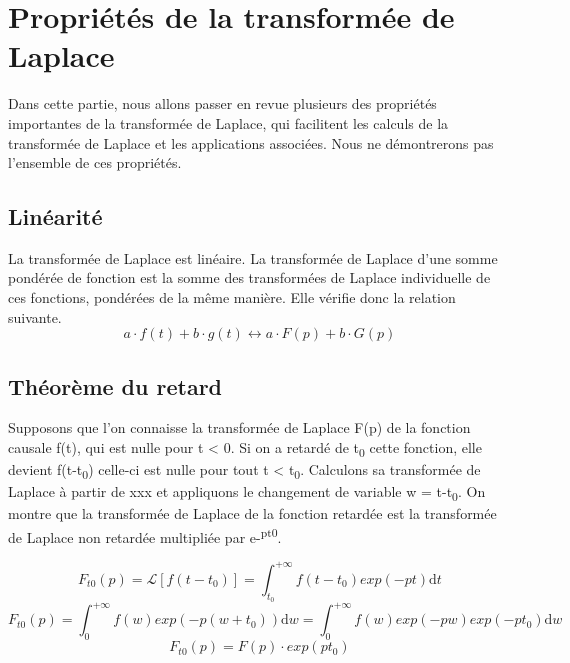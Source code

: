 \documentclass[]{report}
\newcommand{\deriv}{\mathrm{d}}
\begin{document}
	\section{Propriétés de la transformée de Laplace}
	Dans cette partie, nous allons passer en revue plusieurs des propriétés importantes de la transformée de Laplace, qui facilitent les calculs de la transformée de Laplace et les applications associées. Nous ne démontrerons pas l'ensemble de ces propriétés.
	\subsection{Linéarité}
	La transformée de Laplace est linéaire. La transformée de Laplace d'une somme pondérée de fonction est la somme des transformées de Laplace individuelle de ces fonctions, pondérées de la même manière. Elle vérifie donc la relation suivante.
	\begin{equation}\label{key}
	a \cdot f(t)+b \cdot g(t) \longleftrightarrow a \cdot F(p)+b \cdot G(p)
	\end{equation}
	
	\subsection{Théorème du retard}
	
	Supposons que l'on connaisse la transformée de Laplace F(p) de la
	fonction causale f(t), qui est nulle pour t \textless{} 0. Si on a
	retardé de t\textsubscript{0} cette fonction, elle devient
	f(t-t\textsubscript{0}) celle-ci est nulle pour tout t \textless{}
	t\textsubscript{0}. Calculons sa transformée de Laplace à partir de xxx
	et appliquons le changement de variable w = t-t\textsubscript{0}. On
	montre que la transformée de Laplace de la fonction retardée est la
	transformée de Laplace non retardée multipliée par
	e-\textsuperscript{pt0}.
	
	\begin{equation*}
	F_{t0}(p) = \mathcal{L}[f(t-t_{0})]=\int_{t_{0}}^{+\infty}f(t-t_{0})exp(-pt) \deriv t   
	\end{equation*}
	\begin{equation*}
	F_{t0}(p) = \int_{0}^{+\infty}f(w)exp(-p(w+t_{0})) \deriv w = \int_{0}^{+\infty}f(w)exp(-pw)exp(-pt_{0}) \deriv w  
	\end{equation*}
	\begin{equation}\label{}
	F_{t0}(p) = F(p)\cdot exp(pt_{0})
	\end{equation}
	
\end{document}
